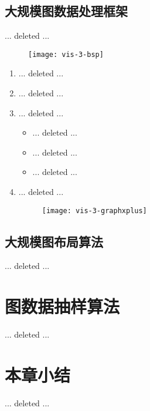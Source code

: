     \subsection{大规模图数据处理框架}

    ... deleted ...

    \begin{figure}[!htbp]
        \centering
        \texttt{[image: vis-3-bsp]}
        \label{fig:vis-3-bsp}
    \end{figure}

    \begin{enumerate}

        \item ... deleted ...
        \item ... deleted ...
        \item ... deleted ...
            \begin{itemize}
            \item ... deleted ...
            \item ... deleted ...
            \item ... deleted ...
            \end{itemize}

        \item ... deleted ...

            \begin{figure}[!htbp]
                \centering
                \texttt{[image: vis-3-graphxplus]}
                \label{fig:vis-3-graphxplus}
            \end{figure}

 
    \end{enumerate}

    \subsection{大规模图布局算法}

    ... deleted ...
 
    \section{图数据抽样算法}\label{图数据抽样算法}

    ... deleted ...





\section{本章小结}

... deleted ...